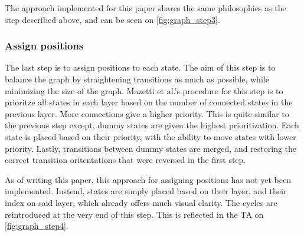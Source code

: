 The approach implemented for this paper shares the same philosophies as the step described above, and can be seen on \cref{fig:graph_step3}.



\subsubsection{Assign positions}
The last step is to assign positions to each state. The aim of this step is to balance the graph by straightening transitions as much as possible, while minimizing the size of the graph.
Mazetti et al.'s procedure for this step is to prioritze all states in each layer based on the number of connected states in the previous layer.
More connections give a higher priority. This is quite similar to the previous step except, dummy states are given the highest prioritization.
Each state is placed based on their priority, with the ability to move states with lower priority.
Lastly, transitions between dummy states are merged, and restoring the correct transition oritentations that were reversed in the first step. \cite{Mazetti2012}

As of writing this paper, this approach for assigning positions has not yet been implemented. Instead, states are simply placed based on their layer, and their index on said layer, which already offers much visual clarity. The cycles are reintroduced at the very end of this step. This is reflected in the TA on \cref{fig:graph_step4}.


